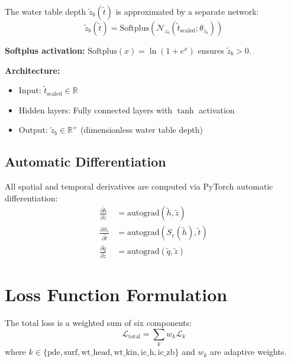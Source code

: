 \documentclass[11pt,a4paper]{article}
\begin{document}
The water table depth $\tilde{z}_b(\tilde{t})$ is approximated by a separate network:
\begin{equation}
    \tilde{z}_b(\tilde{t}) = \text{Softplus}(\mathcal{N}_{z_b}(\tilde{t}_{\text{scaled}}; \theta_{z_b}))
\end{equation}

\textbf{Softplus activation:} $\text{Softplus}(x) = \ln(1 + e^x)$ ensures $\tilde{z}_b > 0$.

\textbf{Architecture:}
\begin{itemize}
    \item Input: $\tilde{t}_{\text{scaled}} \in \mathbb{R}$
    \item Hidden layers: Fully connected layers with $\tanh$ activation
    \item Output: $\tilde{z}_b \in \mathbb{R}^+$ (dimensionless water table depth)
\end{itemize}

\subsection{Automatic Differentiation}

All spatial and temporal derivatives are computed via PyTorch automatic differentiation:
\begin{align}
    \frac{\partial \tilde{h}}{\partial \tilde{z}} &= \text{autograd}(\tilde{h}, \tilde{z}) \\
    \frac{\partial S_e}{\partial \tilde{t}} &= \text{autograd}(S_e(\tilde{h}), \tilde{t}) \\
    \frac{\partial \tilde{q}}{\partial \tilde{z}} &= \text{autograd}(\tilde{q}, \tilde{z})
\end{align}

\section{Loss Function Formulation}

The total loss is a weighted sum of six components:
\begin{equation}
    \mathcal{L}_{\text{total}} = \sum_{k} w_k \mathcal{L}_k
\end{equation}
where $k \in \{\text{pde}, \text{surf}, \text{wt\_head}, \text{wt\_kin}, \text{ic\_h}, \text{ic\_zb}\}$ and $w_k$ are adaptive weights.
\end{document}
